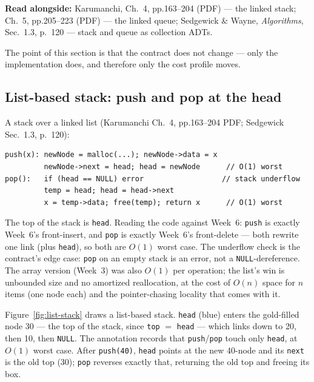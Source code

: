 \documentclass[11pt]{article}
\begin{document}
\textbf{Read alongside:} Karumanchi, Ch.~4, pp.163--204 (PDF) --- the linked stack; Ch.~5, pp.205--223 (PDF) --- the linked queue; Sedgewick \& Wayne, \textit{Algorithms}, Sec.~1.3, p.~120 --- stack and queue as collection ADTs.

 The point of this section is that the contract does not change --- only the implementation does, and therefore only the cost profile moves.

\subsection{List-based stack: push and pop at the head}

A stack over a linked list (Karumanchi Ch.~4, pp.163--204 PDF; Sedgewick Sec.~1.3, p.~120):

{\footnotesize
\begin{verbatim}
push(x): newNode = malloc(...); newNode->data = x
         newNode->next = head; head = newNode      // O(1) worst
pop():   if (head == NULL) error                  // stack underflow
         temp = head; head = head->next
         x = temp->data; free(temp); return x      // O(1) worst
\end{verbatim}
}

The top of the stack is \texttt{head}. Reading the code against Week~6: \texttt{push} is exactly Week~6's front-insert, and \texttt{pop} is exactly Week~6's front-delete --- both rewrite one link (plus \texttt{head}), so both are $O(1)$ worst case. The underflow check is the contract's edge case: \texttt{pop} on an empty stack is an error, not a \texttt{NULL}-dereference. The array version (Week~3) was also $O(1)$ per operation; the list's win is unbounded size and no amortized reallocation, at the cost of $O(n)$ space for $n$ items (one node each) and the pointer-chasing locality that comes with it. \cite{Karumanchi2017_data_structures_algorithms_made_easy,Sedgewick2011_algorithms}

Figure~\ref{fig:list-stack} draws a list-based stack. \texttt{head} (blue) enters the gold-filled node 30 --- the top of the stack, since \texttt{top} $=$ \texttt{head} --- which links down to 20, then 10, then \texttt{NULL}. The annotation records that \texttt{push}/\texttt{pop} touch only \texttt{head}, at $O(1)$ worst case. After \texttt{push(40)}, \texttt{head} points at the new 40-node and its \texttt{next} is the old top (30); \texttt{pop} reverses exactly that, returning the old top and freeing its box.
\end{document}

